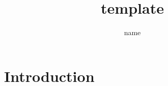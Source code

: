\documentclass{article}
\title{template}
\author{name}
\begin{document}
\maketitle

\section{Introduction}


%
\end{document}
